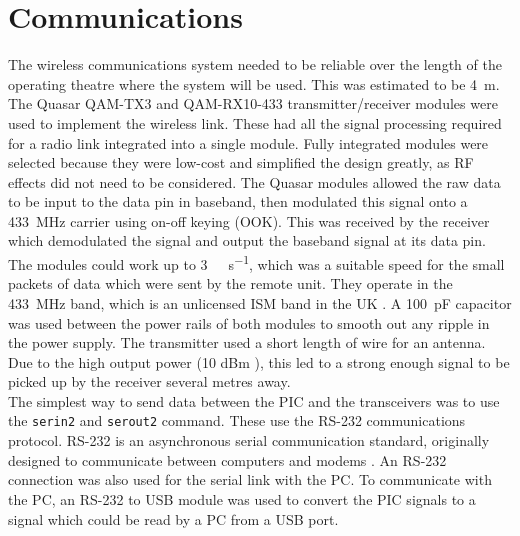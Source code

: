 \section{Communications}

The wireless communications system needed to be reliable over the length of the operating theatre where the system will be used. This was estimated to be \SI{4}{\metre}. The Quasar QAM-TX3 \cite{qam-tx} and QAM-RX10-433 \cite{qam-rx} transmitter/receiver modules were used to implement the wireless link. These had all the signal processing required for a radio link integrated into a single module. Fully integrated modules were selected because they were low-cost and simplified the design greatly, as RF effects did not need to be considered. The Quasar modules allowed the raw data to be input to the data pin in baseband, then modulated this signal onto a \SI{433}{\mega\hertz} carrier using on-off keying (OOK). This was received by the receiver which demodulated the signal and output the baseband signal at its data pin. The modules could work up to \SI{3}{\kilo\bit\per\second}, which was a suitable speed for the small packets of data which were sent by the remote unit. They operate in the \SI{433}{\mega\hertz} band, which is an unlicensed ISM band in the UK \cite{ism_band}. A \SI{100}{\pico\farad} capacitor was used between the power rails of both modules to smooth out any ripple in the power supply. The transmitter used a short length of wire for an antenna. Due to the high output power (10 dBm \cite{qam-tx}), this led to a strong enough signal to be picked up by the receiver several metres away. \\


The simplest way to send data between the PIC and the transceivers was to use the \verb|serin2| and \verb|serout2| command. These use the RS-232 communications protocol. RS-232 is an asynchronous serial communication standard, originally designed to communicate between computers and modems \cite{rs232}. An RS-232 connection was also used for the serial link with the PC. To communicate with the PC, an RS-232 to USB module was used to convert the PIC signals to a signal which could be read by a PC from a USB port.\\

